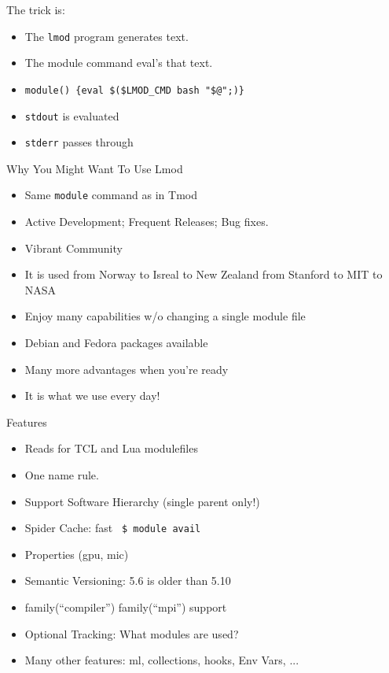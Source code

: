 \documentclass{beamer}
\begin{document}
\begin{frame}{The trick is:}
  \begin{itemize}
    \item The \texttt{lmod} program generates text.
    \item The module command eval's that text.
    \item \texttt{module() \{eval \$(\$LMOD\_CMD bash "\$@";)\}}
    \item \texttt{stdout} is evaluated
    \item \texttt{stderr} passes through
  \end{itemize}
\end{frame}

\begin{frame}{Why You Might Want To Use Lmod}
  \begin{itemize}
    \item Same \texttt{module} command as in Tmod
    \item Active Development;  Frequent Releases; Bug fixes.
    \item Vibrant Community
    \item It is used from Norway to Isreal to New Zealand from Stanford to MIT to NASA
    \item Enjoy many capabilities w/o changing a single module file
    \item Debian and Fedora packages available
    \item Many more advantages when you're ready
    \item It is what we use every day!
  \end{itemize}
\end{frame}


\begin{frame}{Features}
  \begin{itemize}
    \item Reads for TCL and Lua modulefiles
    \item One name rule.
    \item Support Software Hierarchy (single parent only!)
    \item Spider Cache: fast \texttt{\color{blue} \$ module avail}
    \item Properties (gpu, mic)
    \item Semantic Versioning:  5.6 is older than 5.10
    \item family(``compiler'') family(``mpi'') support
    \item Optional Tracking: What modules are used?
    \item Many other features: ml, collections, hooks, Env Vars, ...
  \end{itemize}
\end{frame}
\end{document}
